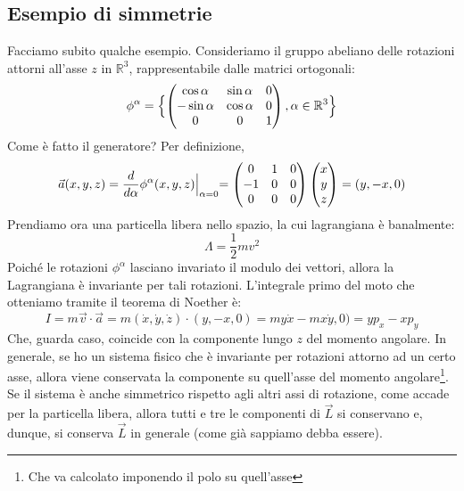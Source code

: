 \documentclass[a4paper,openany]{article}
\begin{document}
	\subsection{Esempio di simmetrie}
	Facciamo subito qualche esempio. Consideriamo il gruppo abeliano delle rotazioni attorni all'asse $z$ in $\mathbb{R}^{3}$, rappresentabile dalle matrici ortogonali:
	\begin{equation}\label{key}
		\phi^{\alpha} = \Bigl\{
		\begin{pmatrix}
			\cos\alpha & \sin\alpha & 0 \\
			-\sin\alpha & \cos\alpha & 0 \\
			0 & 0 & 1 \\
		\end{pmatrix}
		, \alpha\in\mathbb{R}^{3}\Bigl\}
	\end{equation}
	Come è fatto il generatore? Per definizione,
	\begin{equation}\label{key}
		\vec{a}(x,y,z) = \dfrac{d}{d\alpha}\phi^{\alpha}(x,y,z)\Bigl|_{\alpha = 0} = 
		\begin{pmatrix}
			0 & 1 & 0 \\
			-1 & 0 & 0 \\
			0 & 0 & 0 \\
		\end{pmatrix}
		\begin{pmatrix}
			x \\ y \\ z
		\end{pmatrix}
		= (y,-x,0)
	\end{equation}
	Prendiamo ora una particella libera nello spazio, la cui lagrangiana è banalmente:
	$$
	\Lambda = \dfrac{1}{2}mv^{2}
	$$
	Poiché le rotazioni $\phi^{\alpha}$ lasciano invariato il modulo dei vettori, allora la Lagrangiana è invariante per tali rotazioni. L'integrale primo del moto che otteniamo tramite il teorema di Noether è:
	\begin{equation}\label{key}
		I = m\vec{v}\cdot\vec{a} = m(\dot{x},\dot{y},\dot{z})\cdot(y,-x,0) = my\dot{x} - mx\dot{y}, 0) = yp_x-xp_y
	\end{equation}
	Che, guarda caso, coincide con la componente lungo $z$ del momento angolare. In generale, se ho un sistema fisico che è invariante per rotazioni attorno ad un certo asse, allora viene conservata la componente su quell'asse del momento angolare\footnote{Che va calcolato imponendo il polo su quell'asse}. Se il sistema è anche simmetrico rispetto agli altri assi di rotazione, come accade per la particella libera, allora tutti e tre le componenti di $\vec{L}$ si conservano e, dunque, si conserva $\vec{L}$ in generale (come già sappiamo debba essere).
\end{document}
